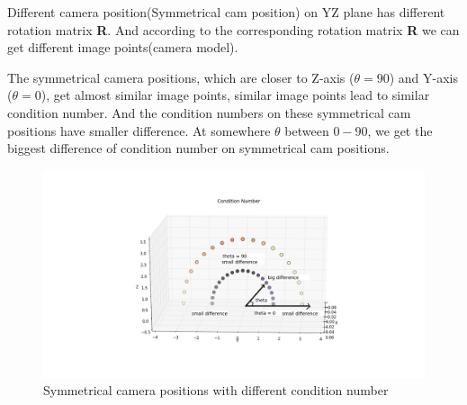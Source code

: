 Different camera position(Symmetrical cam position) on YZ plane has different rotation matrix \textbf{R}. And according to the corresponding rotation matrix \textbf{R} we can get different image points(camera model).

The symmetrical camera positions, which are closer to Z-axis ($\theta = 90$) and Y-axis ($\theta = 0$), get almost similar image points, similar image points lead to similar condition number. And the condition numbers on these symmetrical cam positions have smaller difference.
At somewhere $\theta$ between $0-90$, we get the biggest difference of condition number on symmetrical cam positions.

\begin{figure}[H]
\centering
\hspace*{-4cm}
\includegraphics[scale=0.6]{./fig/connum_symm.png}
\caption{Symmetrical camera positions with different condition number}  
\label{fig:connum_symm}
\end{figure}

